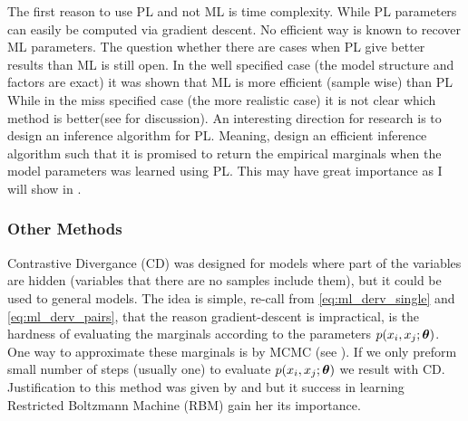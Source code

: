 The first reason to use PL and not ML is time complexity.
While PL parameters can easily be computed via gradient descent.
No efficient way is known to recover ML parameters.
The question whether there are cases when PL give better results than ML is still open.
In the well specified case (the model structure and factors are exact) it was shown that ML is more efficient (sample wise) than PL \cite{liang2008asymptotic}
While in the miss specified case (the more realistic case) it is not clear which method is better(see \cite{varin2011overview} for discussion).
An interesting direction for research is to design an inference algorithm for PL.
Meaning, design an efficient inference algorithm such that it is promised to return the empirical marginals when the model parameters was learned using PL.
This may have great importance as I will show in .

\subsubsection{Other Methods}
Contrastive Divergance (CD) \cite{hinton2002training}  was designed for models where part of the variables are hidden (variables that there are no samples include them), but it could be used to general models.
The idea is simple, re-call from \eqref{eq:ml_derv_single} and \eqref{eq:ml_derv_pairs}, that the reason gradient-descent is impractical,  is  the hardness of evaluating the marginals according to the parameters $p(x_i,x_j;\boldsymbol{\theta})$. 
One way to approximate these marginals  is by MCMC (see ).
If we only preform small number of steps (usually one) to evaluate $p(x_i,x_j;\boldsymbol{\theta})$ we result with CD.
Justification to this method was given by \cite{bengio2009justifying} and \cite{carreira2005contrastive} but it success in learning Restricted Boltzmann Machine (RBM) gain her its importance.

